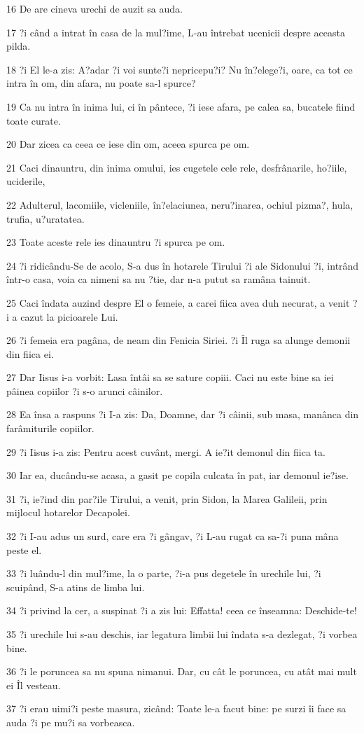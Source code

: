 \par 16 De are cineva urechi de auzit sa auda.
\par 17 ?i când a intrat în casa de la mul?ime, L-au întrebat ucenicii despre aceasta pilda.
\par 18 ?i El le-a zis: A?adar ?i voi sunte?i nepricepu?i? Nu în?elege?i, oare, ca tot ce intra în om, din afara, nu poate sa-l spurce?
\par 19 Ca nu intra în inima lui, ci în pântece, ?i iese afara, pe calea sa, bucatele fiind toate curate.
\par 20 Dar zicea ca ceea ce iese din om, aceea spurca pe om.
\par 21 Caci dinauntru, din inima omului, ies cugetele cele rele, desfrânarile, ho?iile, uciderile,
\par 22 Adulterul, lacomiile, vicleniile, în?elaciunea, neru?inarea, ochiul pizma?, hula, trufia, u?uratatea.
\par 23 Toate aceste rele ies dinauntru ?i spurca pe om.
\par 24 ?i ridicându-Se de acolo, S-a dus în hotarele Tirului ?i ale Sidonului ?i, intrând într-o casa, voia ca nimeni sa nu ?tie, dar n-a putut sa ramâna tainuit.
\par 25 Caci îndata auzind despre El o femeie, a carei fiica avea duh necurat, a venit ?i a cazut la picioarele Lui.
\par 26 ?i femeia era pagâna, de neam din Fenicia Siriei. ?i Îl ruga sa alunge demonii din fiica ei.
\par 27 Dar Iisus i-a vorbit: Lasa întâi sa se sature copiii. Caci nu este bine sa iei pâinea copiilor ?i s-o arunci câinilor.
\par 28 Ea însa a raspuns ?i I-a zis: Da, Doamne, dar ?i câinii, sub masa, manânca din farâmiturile copiilor.
\par 29 ?i Iisus i-a zis: Pentru acest cuvânt, mergi. A ie?it demonul din fiica ta.
\par 30 Iar ea, ducându-se acasa, a gasit pe copila culcata în pat, iar demonul ie?ise.
\par 31 ?i, ie?ind din par?ile Tirului, a venit, prin Sidon, la Marea Galileii, prin mijlocul hotarelor Decapolei.
\par 32 ?i I-au adus un surd, care era ?i gângav, ?i L-au rugat ca sa-?i puna mâna peste el.
\par 33 ?i luându-l din mul?ime, la o parte, ?i-a pus degetele în urechile lui, ?i scuipând, S-a atins de limba lui.
\par 34 ?i privind la cer, a suspinat ?i a zis lui: Effatta! ceea ce înseamna: Deschide-te!
\par 35 ?i urechile lui s-au deschis, iar legatura limbii lui îndata s-a dezlegat, ?i vorbea bine.
\par 36 ?i le poruncea sa nu spuna nimanui. Dar, cu cât le poruncea, cu atât mai mult ei Îl vesteau.
\par 37 ?i erau uimi?i peste masura, zicând: Toate le-a facut bine: pe surzi îi face sa auda ?i pe mu?i sa vorbeasca.

